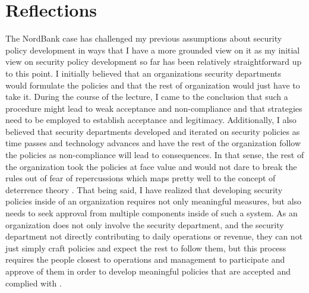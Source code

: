 \documentclass[12pt]{article}
\begin{document}
\section{Reflections}
The NordBank case has challenged my previous assumptions about security policy development in ways that I have a more grounded view on it as my initial view on security policy development so far has been relatively straightforward up to this point. 
\newline
I initially believed that an organizations security departments would formulate the policies and that the rest of organization would just have to take it. During the course of the lecture, I came to the conclusion that such a procedure might lead to weak acceptance and non-compliance \cite{d2019predicting} and that strategies need to be employed to establish acceptance and legitimacy.
\newline
Additionally, I also believed that security departments developed and iterated on security policies as time passes and technology advances and have the rest of the organization follow the policies as non-compliance will lead to consequences. In that sense, the rest of the organization took the policies at face value and would not dare to break the rules out of fear of repercussions which maps pretty well to the concept of deterrence theory \cite{jervis1979deterrence}.
\newline
That being said, I have realized that developing security policies inside of an organization requires not only meaningful measures, but also needs to seek approval from multiple components inside of such a system. As an organization does not only involve the security department, and the security department not directly contributing to daily operations or revenue, they can not just simply craft policies and expect the rest to follow them, but this process requires the people closest to operations and management to participate and approve of them in order to develop meaningful policies that are accepted and complied with \cite{flowerday2016information}.



\end{document}
